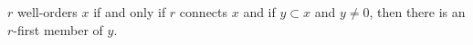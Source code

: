$r$ well-orders $x$ if and only if $r$ connects $x$ and if $y \subset x$ and $y \neq 0$, then there is an $r$-first member of $y$.
